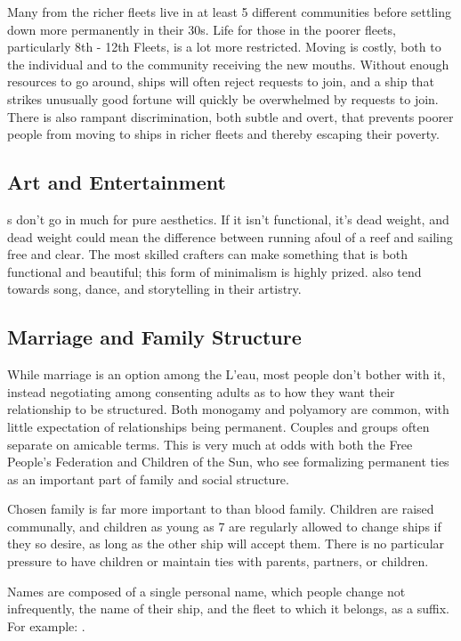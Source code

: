 \documentclass[blue]{GL2020}
\begin{document}
Many \pShippies{} from the richer fleets live in at least 5 different communities before settling down more permanently in their 30s. Life for those in the poorer fleets, particularly 8th - 12th Fleets, is a lot more restricted. Moving is costly, both to the individual and to the community receiving the new mouths. Without enough resources to go around, ships will often reject requests to join, and a ship that strikes unusually good fortune will quickly be overwhelmed by requests to join. There is also rampant discrimination, both subtle and overt, that prevents poorer people from moving to ships in richer fleets and thereby escaping their poverty.

\subsection{Art and Entertainment}
\pShippies{}s don't go in much for pure aesthetics. If it isn't functional, it's dead weight, and dead weight could mean the difference between running afoul of a reef and sailing free and clear. The most skilled crafters can make something that is both functional and beautiful; this form of minimalism is highly prized. \pShippies{} also tend towards song, dance, and storytelling in their artistry.

\subsection*{Marriage and Family Structure}
While marriage is an option among the L'eau, most people don't bother with it, instead negotiating among consenting adults as to how they want their relationship to be structured. Both monogamy and polyamory are common, with little expectation of relationships being permanent. Couples and groups often separate on amicable terms. This is very much at odds with both the Free People's Federation and Children of the Sun, who see formalizing permanent ties as an important part of family and social structure.

Chosen family is far more important to \pShippies{} than blood family. Children are raised communally, and children as young as 7 are regularly allowed to change ships if they so desire, as long as the other ship will accept them. There is no particular pressure to have children or maintain ties with parents, partners, or children.

Names are composed of a single personal name, which people change not infrequently, the name of their ship, and the fleet to which it belongs, as a suffix. For example: \cLoud{\full}. 
\end{document}
